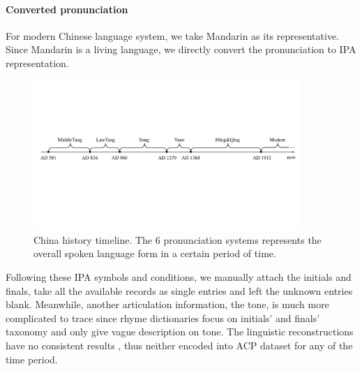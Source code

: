     \paragraph{Converted pronunciation}
    For modern Chinese language system, we take Mandarin as its representative. Since Mandarin is a living language, we directly convert the pronunciation to IPA representation.

\begin{figure}[ht]
    \centering
    \includegraphics[width=0.9\textwidth]{images/history_tl.pdf}
    \caption{China history timeline. The 6 pronunciation systems represents the overall spoken language form in a certain period of time. 
    }
    \label{fig:timeline}
\end{figure}

Following these IPA symbols and conditions, we manually attach the initials and finals, take all the available records as single entries and left the unknown entries blank. Meanwhile, another articulation information, the tone, is much more complicated to trace since rhyme dictionaries focus on initials' and finals' taxonomy and only give vague description on tone\cite{wang_l_hanyu_2012}. The linguistic reconstructions have no consistent results \cite{zhiping_1986_tone, xiangdong_earlytang, wuyun_1982}, thus neither encoded into ACP dataset for any of the time period. 


